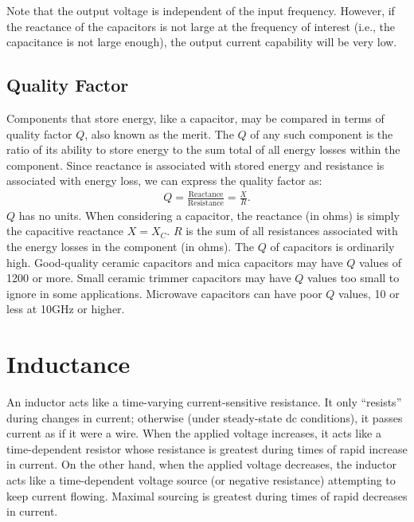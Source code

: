 \documentclass[../../document]{subfiles}
\begin{document}
Note that the output voltage is independent of the input frequency. However, if
the reactance of the capacitors is not large at the frequency of interest
(i.e., the capacitance is not large enough), the output current capability
will be very low. \cite{practical_electronics}

\subsection{Quality Factor}
Components that store energy, like a capacitor, may be compared in terms of
quality factor \(Q\), also known as the merit. The \(Q\)  of any such component
is the ratio of its ability to store energy to the sum total of all energy
losses within the component. Since reactance is associated with stored energy
and resistance is associated with energy loss, we can express the quality
factor as:
\begin{gather}
	Q=\frac{\text{Reactance}}{\text{Resistance}}=\frac{X}{R}.
\end{gather}
\(Q\)  has no units. When considering a capacitor, the reactance (in ohms) is
simply the capacitive reactance \(X=X_C\).  \(R\) is the sum of all resistances
associated with the energy losses in the component (in ohms). The \(Q\)  of
capacitors is ordinarily high. Good-quality ceramic capacitors and mica
capacitors may have \(Q\)  values of 1200 or more. Small ceramic trimmer
capacitors may have \(Q\) values too small to ignore in some applications.
Microwave capacitors can have poor \(Q\)  values, 10 or less at
10\unit{\giga\hertz} or higher. \cite{practical_electronics}

\section{Inductance}
An inductor acts like a time-varying current-sensitive resistance. It only
\enquote{resists} during changes in current; otherwise (under steady-state dc
conditions), it passes current as if it were a wire. When the applied voltage
increases, it acts like a time-dependent resistor whose resistance is greatest
during times of rapid increase in current. On the other hand, when the applied
voltage decreases, the inductor acts like a time-dependent voltage source (or
negative resistance) attempting to keep current flowing. Maximal sourcing is
greatest during times of rapid decreases in current. \cite{practical_electronics}
\end{document}
